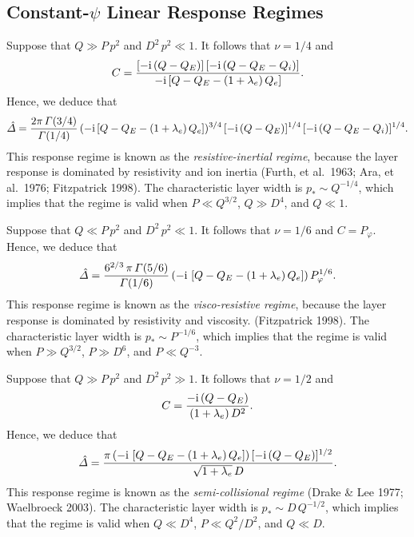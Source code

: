 \documentclass[notitlepage,12pt]{article}
\begin{document}
\subsection{Constant-$\psi$ Linear Response Regimes}\label{scp}
Suppose that $Q\gg P\,p^2$ and $D^2\,p^2 \ll 1$. It follows that $\nu=1/4$ and
\begin{equation}
C = \frac{[-{\rm i}\,(Q-Q_E)]\,[-{\rm i}\,(Q-Q_E-Q_i)]}{-{\rm i}\,[Q-Q_E-(1+\lambda_e)\,Q_e]}.
\end{equation}
Hence, we deduce that
\begin{equation}\label{ri}
\hat{\mit\Delta} = \frac{2\pi\,{\mit\Gamma}(3/4)}{{\mit\Gamma}(1/4)}\,(-{\rm i}\,[Q-Q_E-(1+\lambda_e)\,Q_e])^{3/4}\,[-{\rm i}\,(Q-Q_E)]^{1/4}\,[-{\rm i}\,(Q-Q_E-Q_i)]^{1/4}.
\end{equation}
This response regime is known as the {\em resistive-inertial regime}, because the layer response is dominated by
resistivity and ion inertia (Furth, et al.\ 1963; Ara, et al.\ 1976; Fitzpatrick 1998). The characteristic layer width is $p_\ast \sim Q^{-1/4}$,
which implies that the regime is valid when $P\ll Q^{3/2}$, $Q\gg D^4$, and $Q\ll 1$. 

Suppose that $Q\ll P\,p^2$ and $D^2\,p^2\ll 1$. It follows that $\nu=1/6$ and $C=P_\varphi$. 
Hence, we deduce that
\begin{equation}\label{vr}
\hat{\mit\Delta} = \frac{6^{2/3}\,\pi\,{\mit\Gamma}(5/6)}{{\mit\Gamma}(1/6)}\, (-{\rm i}\,\left[Q-Q_E-(1+\lambda_e)\,Q_e\right])\,P_\varphi^{1/6}.
\end{equation}
This response regime is known as the {\em visco-resistive regime}, because the layer response is dominated by
resistivity and viscosity. (Fitzpatrick 1998). The characteristic layer width is $p_\ast \sim P^{-1/6}$, which implies that
the regime is valid when  $P\gg Q^{3/2}$, $P\gg D^6$, and $P\ll Q^{-3}$. 

Suppose that $Q\gg P\,p^2$ and $D^2\,p^2\gg 1$. It follows that $\nu=1/2$ and
\begin{equation}
C = \frac{-{\rm i}\,(Q-Q_E)}{(1+\lambda_e)\,D^2}.
\end{equation}
Hence, we deduce that
\begin{equation}\label{sc}
\hat{\mit\Delta}= \frac{\pi\,(-{\rm i}\,\left[Q-Q_E-(1+\lambda_e)\,Q_e\right])\,[-{\rm i}\,(Q-Q_E)]^{1/2}}{\sqrt{1+\lambda_e}\,D}.
\end{equation}
This response regime is known as the {\em semi-collisional regime}\/ (Drake \& Lee 1977; Waelbroeck 2003). The characteristic
layer width is $p_\ast\sim D\,Q^{-1/2}$, which implies that the regime is valid when $Q\ll D^4$,
 $P\ll Q^2/D^2$, and $Q\ll D$. 
\end{document}
